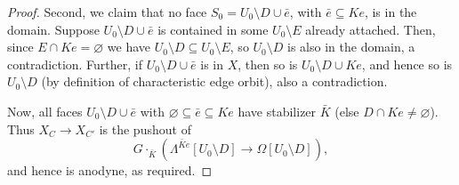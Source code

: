 \documentclass[a4paper,10pt,draft]{article}%
\numberwithin{equation}{section}%
\begin{document}
\begin{proof}
      Second, we claim that no face $S_0 = U_0 \setminus D \cup \bar e$, with $\bar e \subseteq K e$, is in the domain.
      Suppose $U_0 \setminus D \cup \bar e$ is contained in some $U_0 \setminus E$ already attached.
      Then, since $E \cap K e = \varnothing$ we have $U_0 \setminus D \subseteq U_0 \setminus E$, so
      $U_0 \setminus D$ is also in the domain, a contradiction.
      Further, if $U_0 \setminus D \cup \bar e$ is in $X$, then so is $U_0 \setminus D \cup K e$, and hence
      so is $U_0 \setminus D$ (by definition of characteristic edge orbit), also a contradiction.

      Now, all faces $U_0 \setminus D \cup \bar e$ with $\varnothing \subseteq \bar e \subseteq K e$ have stabilizer $\bar K$
      (else $D \cap K e \neq \varnothing$).
      Thus $X_C \to X_{C'}$ is the pushout of
      \begin{equation}
            \label{CHAR_HORN_EQ}
            G \cdot_{\bar K} \left( \Lambda^{\bar K e}[U_0 \setminus D] \to \Omega[U_0 \setminus D] \right),
      \end{equation}
      and hence is anodyne, as required.
\end{proof}
\end{document}
